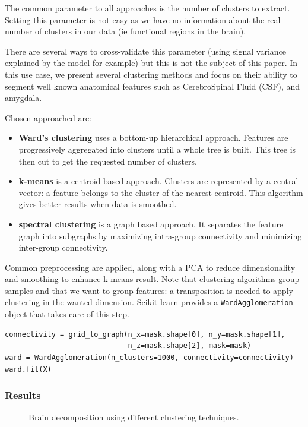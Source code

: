 \documentclass{frontiersSCNS} %
\begin{document}
The common parameter to all approaches is the number of clusters to extract.
Setting this parameter is not easy as we have no information about the real
number of clusters in our data (ie functional regions in the brain).

There are several ways to cross-validate this parameter (using signal variance
explained by the model for example) but this is not the subject of this paper.
In this use case, we present several clustering methods and focus on their
ability to segment well known anatomical features such as CerebroSpinal Fluid
(CSF), and amygdala.

Chosen approached are:
\begin{itemize}
    \item{\bf Ward's clustering} uses a bottom-up hierarchical approach. Features are
        progressively aggregated into clusters until a whole tree is built. This
        tree is then cut to get the requested number of clusters.
    \item{\bf k-means} is a centroid based approach. Clusters are represented by
        a central vector: a feature belongs to the cluster of the nearest
        centroid. This algorithm gives better results when data is smoothed.
    \item{\bf spectral clustering} is a graph based approach. It separates
        the feature graph into subgraphs by maximizing intra-group connectivity and
        minimizing inter-group connectivity.
\end{itemize}

Common preprocessing are applied, along with a PCA to reduce dimensionality and
smoothing to enhance k-means result. Note that clustering algorithms group
samples and that we want to group features: a transposition is needed to apply
clustering in the wanted dimension. Scikit-learn provides a
\texttt{WardAgglomeration} object that takes care of this step.

\begin{lstlisting}
connectivity = grid_to_graph(n_x=mask.shape[0], n_y=mask.shape[1],
                             n_z=mask.shape[2], mask=mask)
ward = WardAgglomeration(n_clusters=1000, connectivity=connectivity)
ward.fit(X)
\end{lstlisting}

\subsubsection{Results}

\begin{figure}[hbtp]
  \begin{center}
  \end{center}
  \caption{Brain decomposition using different clustering techniques.}
  \label{fig:clustering}
\end{figure}
\end{document}
